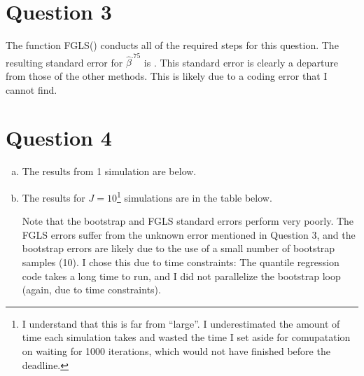 \documentclass{article}
\newcommand{\bhat}{\hat{\beta}}
\begin{document}
\section*{Question 3}
The function FGLS() conducts all of the required steps for this question. The resulting standard error for $\bhat^{.75}$ is . This standard error is clearly a departure from those of the other methods. This is likely due to a coding error that I cannot find.

\section*{Question 4}

\begin{enumerate}[(a)]
    \item The results from 1 simulation are below.
        \begin{center}
            
        \end{center} 

    \item The results for $J=10$\footnote{I understand that this is far from ``large''. I underestimated the amount of time each simulation takes and wasted the time I set aside for comupatation on waiting for 1000 iterations, which would not have finished before the deadline.} simulations are in the table below. 
        \begin{center}
                
        \end{center}
        Note that the bootstrap and FGLS standard errors perform very poorly. The FGLS errors suffer from the unknown error mentioned in Question 3, and the bootstrap errors are likely due to the use of a small number of bootstrap samples (10). I chose this due to time constraints: The quantile regression code takes a long time to run, and I did not parallelize the bootstrap loop (again, due to time constraints).

\end{enumerate}

\end{document}
